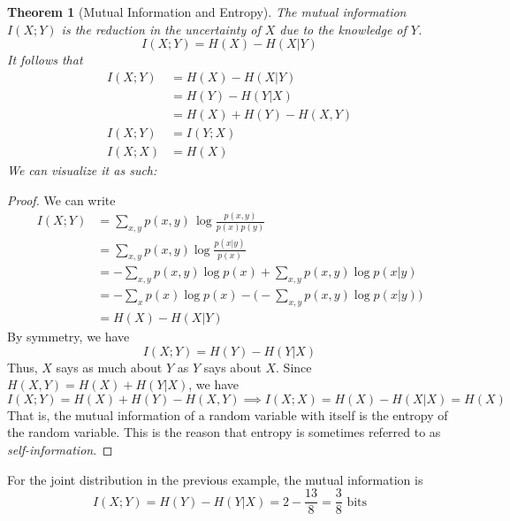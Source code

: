\documentclass[a4paper, 12pt]{report}
\newtheorem{theorem}{Theorem}[section]
\theoremstyle{remark}
\theoremstyle{definition}
\begin{document}
\begin{theorem}[Mutual Information and Entropy]
The mutual information $I(X;Y)$ is the reduction in the uncertainty of $X$ due to the knowledge of $Y$. 
\[I(X;Y) = H(X) - H(X|Y)\]
It follows that
\begin{align*}
    I(X;Y) & = H(X) - H(X|Y) \\
    & = H(Y) - H(Y|X) \\
    & = H(X) + H(Y) - H(X, Y) \\
    I(X;Y) & = I(Y;X) \\
    I(X;X) & = H(X)
\end{align*}
We can visualize it as such: 
\begin{center}
\end{center}
\end{theorem}
\begin{proof}
We can write
\begin{align*}
    I(X;Y) & = \sum_{x, y} p(x, y) \, \log \frac{p(x, y)}{p(x)p(y)} \\
    & = \sum_{x, y} p(x, y) \log \frac{p(x|y)}{p(x)} \\
    & = - \sum_{x, y} p(x, y) \log p(x) + \sum_{x, y} p(x, y) \log p(x|y) \\
    & = - \sum_x p(x) \log p(x) - \Bigg( - \sum_{x, y} p(x, y) \log p(x|y) \Bigg) \\
    & = H(X) - H(X|Y)
\end{align*}
By symmetry, we have
\[I(X;Y) = H(Y) - H(Y|X)\]
Thus, $X$ says as much about $Y$ as $Y$ says about $X$. Since $H(X, Y) = H(X) + H(Y|X)$, we have
\[I(X;Y) = H(X) + H(Y) - H(X, Y) \implies I(X;X) = H(X) - H(X|X) = H(X)\]
That is, the mutual information of a random variable with itself is the entropy of the random variable. This is the reason that entropy is sometimes referred to as \textit{self-information}. 
\end{proof}

\begin{example}
For the joint distribution in the previous example, the mutual information is 
\[I(X;Y) = H(Y) - H(Y|X) = 2 - \frac{13}{8} = \frac{3}{8} \text{ bits}\]
\end{example}
\end{document}
